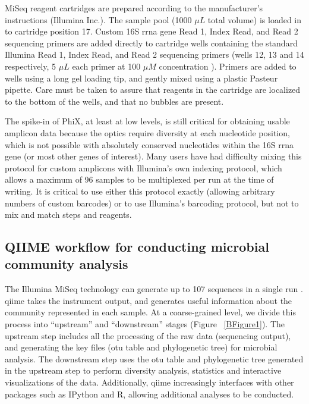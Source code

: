 MiSeq reagent cartridges are prepared according to the manufacturer's instructions (Illumina Inc.).
The sample pool (1000 $\mu L$ total volume) is loaded in to cartridge position 17. Custom 16S \gls{rrna}
gene Read 1, Index Read, and Read 2 sequencing primers are added directly to cartridge wells containing
the standard Illumina Read 1, Index Read, and Read 2 sequencing primers (wells 12, 13 and 14 respectively,
5 $\mu L$ each primer at 100 $\mu M$ concentration \cite{Caporaso2012}). Primers are added to wells using
a long gel loading tip, and gently mixed using a plastic Pasteur pipette. Care must be taken to assure that
reagents in the cartridge are localized to the bottom of the wells, and that no bubbles are present.

The spike-in of PhiX, at least at low levels, is still critical for obtaining usable amplicon data because
the optics require diversity at each nucleotide position, which is not possible with absolutely conserved
nucleotides within the 16S \gls{rrna} gene (or most other genes of interest). Many users have had difficulty
mixing this protocol for custom amplicons with Illumina's own indexing protocol, which allows a maximum of
96 samples to be multiplexed per run at the time of writing. It is critical to use either this protocol exactly
(allowing arbitrary numbers of custom barcodes) or to use Illumina's barcoding protocol, but not to mix and
match steps and reagents.

\subsection{QIIME workflow for conducting microbial community analysis}

The Illumina MiSeq technology can generate up to 107 sequences in a single run \cite{Kuczynski2011}.
\gls{qiime} takes the instrument output, and generates useful information about the community represented
in each sample. At a coarse-grained level, we divide this process into “upstream” and “downstream” stages
(Figure ~\ref{BFigure1}). The upstream step includes all the processing of the raw data (sequencing output),
and generating the key files (\gls{otu} table and phylogenetic tree) for microbial analysis. The downstream
step uses the \gls{otu} table and phylogenetic tree generated in the upstream step to perform diversity
analysis, statistics and interactive visualizations of the data. Additionally, \gls{qiime} increasingly
interfaces with other packages such as IPython and R, allowing additional analyses to be conducted.

